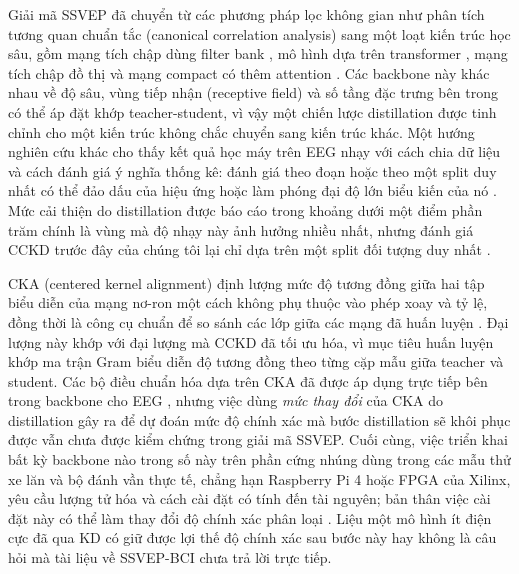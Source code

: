\documentclass[11pt,a4paper,twoside,asymmetric]{article}
\begin{document}
Giải mã SSVEP đã chuyển từ các phương pháp lọc không gian như phân tích tương quan chuẩn tắc (canonical correlation analysis) sang một loạt kiến trúc học sâu, gồm mạng tích chập dùng filter bank \cite{R16}, mô hình dựa trên transformer \cite{R15,R23}, mạng tích chập đồ thị \cite{R18} và mạng compact có thêm attention \cite{R19,R20,R21,R26,R29}. Các backbone này khác nhau về độ sâu, vùng tiếp nhận (receptive field) và số tầng đặc trưng bên trong có thể áp đặt khớp teacher-student, vì vậy một chiến lược distillation được tinh chỉnh cho một kiến trúc không chắc chuyển sang kiến trúc khác. Một hướng nghiên cứu khác cho thấy kết quả học máy trên EEG nhạy với cách chia dữ liệu và cách đánh giá ý nghĩa thống kê: đánh giá theo đoạn hoặc theo một split duy nhất có thể đảo dấu của hiệu ứng hoặc làm phóng đại độ lớn biểu kiến của nó \cite{R75,R76,R77,R78,R79,R80,R81}. Mức cải thiện do distillation được báo cáo trong khoảng dưới một điểm phần trăm chính là vùng mà độ nhạy này ảnh hưởng nhiều nhất, nhưng đánh giá CCKD trước đây của chúng tôi lại chỉ dựa trên một split đối tượng duy nhất \cite{R82}.

CKA (centered kernel alignment) định lượng mức độ tương đồng giữa hai tập biểu diễn của mạng nơ-ron một cách không phụ thuộc vào phép xoay và tỷ lệ, đồng thời là công cụ chuẩn để so sánh các lớp giữa các mạng đã huấn luyện \cite{R73,R74,R71,R72}. Đại lượng này khớp với đại lượng mà CCKD đã tối ưu hóa, vì mục tiêu huấn luyện khớp ma trận Gram biểu diễn độ tương đồng theo từng cặp mẫu giữa teacher và student. Các bộ điều chuẩn hóa dựa trên CKA đã được áp dụng trực tiếp bên trong backbone cho EEG \cite{R70}, nhưng việc dùng \emph{mức thay đổi} của CKA do distillation gây ra để dự đoán mức độ chính xác mà bước distillation sẽ khôi phục được vẫn chưa được kiểm chứng trong giải mã SSVEP. Cuối cùng, việc triển khai bất kỳ backbone nào trong số này trên phần cứng nhúng dùng trong các mẫu thử xe lăn và bộ đánh vần thực tế, chẳng hạn Raspberry Pi 4 hoặc FPGA của Xilinx, yêu cầu lượng tử hóa và cách cài đặt có tính đến tài nguyên; bản thân việc cài đặt này có thể làm thay đổi độ chính xác phân loại \cite{R58,R60,R62,R63}. Liệu một mô hình ít điện cực đã qua KD có giữ được lợi thế độ chính xác sau bước này hay không là câu hỏi mà tài liệu về SSVEP-BCI chưa trả lời trực tiếp.
\end{document}
